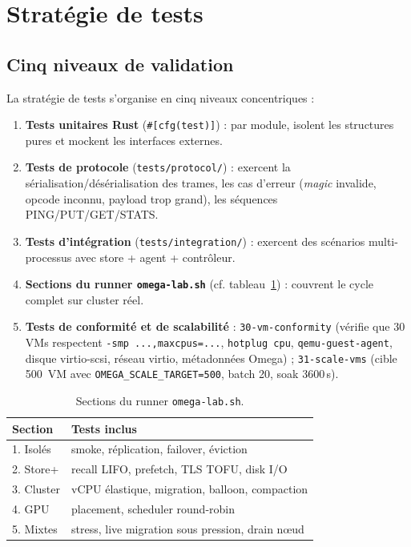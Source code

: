 \section{Stratégie de tests}
\label{sec:tests}

\subsection{Cinq niveaux de validation}

La stratégie de tests s'organise en cinq niveaux concentriques :
\begin{enumerate}[leftmargin=*]
    \item \textbf{Tests unitaires Rust} (\texttt{\#[cfg(test)]}) : par module, isolent les structures pures et mockent les interfaces externes.
    \item \textbf{Tests de protocole} (\texttt{tests/protocol/}) : exercent la sérialisation/désérialisation des trames, les cas d'erreur (\emph{magic} invalide, opcode inconnu, payload trop grand), les séquences PING/PUT/GET/STATS.
    \item \textbf{Tests d'intégration} (\texttt{tests/integration/}) : exercent des scénarios multi-processus avec store + agent + contrôleur.
    \item \textbf{Sections du runner \texttt{omega-lab.sh}} (cf. tableau~\ref{tab:test-sections}) : couvrent le cycle complet sur cluster réel.
    \item \textbf{Tests de conformité et de scalabilité} : \texttt{30-vm-conformity} (vérifie que 30 VMs respectent \texttt{-smp ...,maxcpus=...}, \texttt{hotplug cpu}, \texttt{qemu-guest-agent}, disque virtio-scsi, réseau virtio, métadonnées Omega) ; \texttt{31-scale-vms} (cible 500~VM avec \texttt{OMEGA\_SCALE\_TARGET=500}, batch 20, soak 3600\,s).
\end{enumerate}

\begin{table}[H]
\centering
\small
\caption{Sections du runner \texttt{omega-lab.sh}.}
\begin{tabular}{lp{9cm}}
\toprule
\textbf{Section} & \textbf{Tests inclus} \\
\midrule
1. Isolés    & smoke, réplication, failover, éviction \\
2. Store+    & recall LIFO, prefetch, TLS TOFU, disk I/O \\
3. Cluster   & vCPU élastique, migration, balloon, compaction \\
4. GPU       & placement, scheduler round-robin \\
5. Mixtes    & stress, live migration sous pression, drain nœud \\
\bottomrule
\end{tabular}
\label{tab:test-sections}
\end{table}

